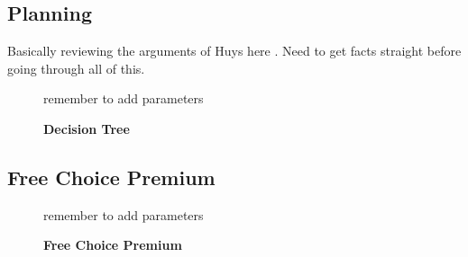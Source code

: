 \documentclass[11pt]{article} %
\begin{document}
\subsection{Planning}

Basically reviewing the arguments of Huys here \cite{Huys2012, Lally2017}.
Need to get facts straight before going through all of this.

\begin{figure}
  \centerline{%
  }
  \caption{\textbf{Decision Tree}}
  \par remember to add parameters
\end{figure}

\subsection{Free Choice Premium}

\begin{figure}
  \centerline{%
  }
  \caption{\textbf{Free Choice Premium}}
  \par remember to add parameters
\end{figure}
\end{document}
